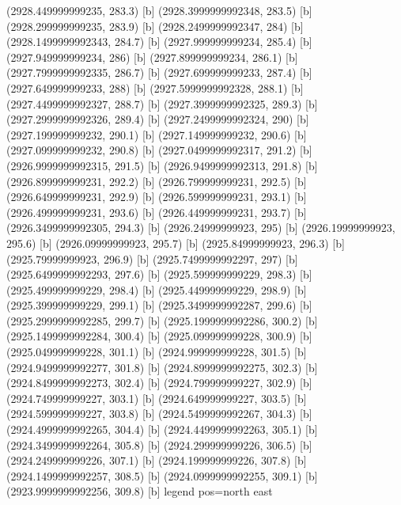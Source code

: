 {{{(2928.449999999235, 283.3) [b] 
(2928.3999999992348, 283.5) [b] 
(2928.299999999235, 283.9) [b] 
(2928.2499999992347, 284) [b] 
(2928.1499999992343, 284.7) [b] 
(2927.999999999234, 285.4) [b] 
(2927.949999999234, 286) [b] 
(2927.899999999234, 286.1) [b] 
(2927.7999999992335, 286.7) [b] 
(2927.699999999233, 287.4) [b] 
(2927.649999999233, 288) [b] 
(2927.5999999992328, 288.1) [b] 
(2927.4499999992327, 288.7) [b] 
(2927.3999999992325, 289.3) [b] 
(2927.2999999992326, 289.4) [b] 
(2927.2499999992324, 290) [b] 
(2927.199999999232, 290.1) [b] 
(2927.149999999232, 290.6) [b] 
(2927.099999999232, 290.8) [b] 
(2927.0499999992317, 291.2) [b] 
(2926.9999999992315, 291.5) [b] 
(2926.9499999992313, 291.8) [b] 
(2926.899999999231, 292.2) [b] 
(2926.799999999231, 292.5) [b] 
(2926.649999999231, 292.9) [b] 
(2926.599999999231, 293.1) [b] 
(2926.499999999231, 293.6) [b] 
(2926.449999999231, 293.7) [b] 
(2926.3499999992305, 294.3) [b] 
(2926.24999999923, 295) [b] 
(2926.19999999923, 295.6) [b] 
(2926.09999999923, 295.7) [b] 
(2925.84999999923, 296.3) [b] 
(2925.79999999923, 296.9) [b] 
(2925.7499999992297, 297) [b] 
(2925.6499999992293, 297.6) [b] 
(2925.599999999229, 298.3) [b] 
(2925.499999999229, 298.4) [b] 
(2925.449999999229, 298.9) [b] 
(2925.399999999229, 299.1) [b] 
(2925.3499999992287, 299.6) [b] 
(2925.2999999992285, 299.7) [b] 
(2925.1999999992286, 300.2) [b] 
(2925.1499999992284, 300.4) [b] 
(2925.099999999228, 300.9) [b] 
(2925.049999999228, 301.1) [b] 
(2924.999999999228, 301.5) [b] 
(2924.9499999992277, 301.8) [b] 
(2924.8999999992275, 302.3) [b] 
(2924.8499999992273, 302.4) [b] 
(2924.799999999227, 302.9) [b] 
(2924.749999999227, 303.1) [b] 
(2924.649999999227, 303.5) [b] 
(2924.599999999227, 303.8) [b] 
(2924.5499999992267, 304.3) [b] 
(2924.4999999992265, 304.4) [b] 
(2924.4499999992263, 305.1) [b] 
(2924.3499999992264, 305.8) [b] 
(2924.299999999226, 306.5) [b] 
(2924.249999999226, 307.1) [b] 
(2924.199999999226, 307.8) [b] 
(2924.1499999992257, 308.5) [b] 
(2924.0999999992255, 309.1) [b] 
(2923.9999999992256, 309.8) [b] 
}}}{legend pos=north east}